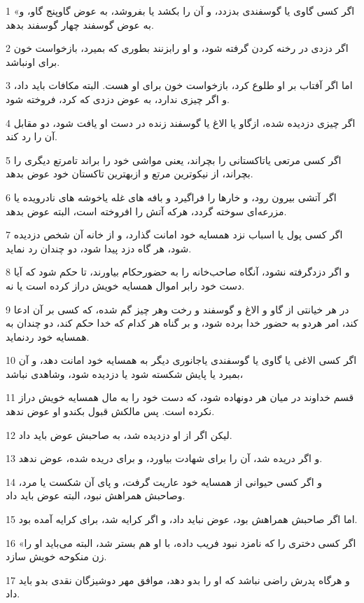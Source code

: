 \par 1 «اگر کسی گاوی یا گوسفندی بدزدد، و آن را بکشد یا بفروشد، به عوض گاوپنج گاو، و به عوض گوسفند چهار گوسفند بدهد.
\par 2 اگر دزدی در رخنه کردن گرفته شود، و او رابزنند بطوری که بمیرد، بازخواست خون برای اونباشد.
\par 3 اما اگر آفتاب بر او طلوع کرد، بازخواست خون برای او هست. البته مکافات باید داد، و اگر چیزی ندارد، به عوض دزدی که کرد، فروخته شود.
\par 4 اگر چیزی دزدیده شده، ازگاو یا الاغ یا گوسفند زنده در دست او یافت شود، دو مقابل آن را رد کند.
\par 5 اگر کسی مرتعی یاتاکستانی را بچراند، یعنی مواشی خود را براند تامرتع دیگری را بچراند، از نیکوترین مرتع و ازبهترین تاکستان خود عوض بدهد.
\par 6 اگر آتشی بیرون رود، و خارها را فراگیرد و بافه های غله یاخوشه های نادرویده یا مزرعه‌ای سوخته گردد، هر‌که آتش را افروخته است، البته عوض بدهد. 
\par 7 اگر کسی پول یا اسباب نزد همسایه خود امانت گذارد، و از خانه آن شخص دزدیده شود، هر گاه دزد پیدا شود، دو چندان رد نماید.
\par 8 و اگر دزدگرفته نشود، آنگاه صاحب‌خانه را به حضورحکام بیاورند، تا حکم شود که آیا دست خود رابر اموال همسایه خویش دراز کرده است یا نه.
\par 9 در هر خیانتی از گاو و الاغ و گوسفند و رخت وهر چیز گم شده، که کسی بر آن ادعا کند، امر هردو به حضور خدا برده شود، و بر گناه هر کدام که خدا حکم کند، دو چندان به همسایه خود ردنماید.
\par 10 اگر کسی الاغی یا گاوی یا گوسفندی یاجانوری دیگر به همسایه خود امانت دهد، و آن بمیرد یا پایش شکسته شود یا دزدیده شود، وشاهدی نباشد،
\par 11 قسم خداوند در میان هر دونهاده شود، که دست خود را به مال همسایه خویش دراز نکرده است. پس مالکش قبول بکندو او عوض ندهد.
\par 12 لیکن اگر از او دزدیده شد، به صاحبش عوض باید داد.
\par 13 و اگر دریده شد، آن را برای شهادت بیاورد، و برای دریده شده، عوض ندهد.
\par 14 و اگر کسی حیوانی از همسایه خود عاریت گرفت، و پای آن شکست یا مرد، وصاحبش همراهش نبود، البته عوض باید داد.
\par 15 اما اگر صاحبش همراهش بود، عوض نباید داد، و اگر کرایه شد، برای کرایه آمده بود.
\par 16 «اگر کسی دختری را که نامزد نبود فریب داده، با او هم بستر شد، البته می‌باید او را زن منکوحه خویش سازد.
\par 17 و هرگاه پدرش راضی نباشد که او را بدو دهد، موافق مهر دوشیزگان نقدی بدو باید داد.
